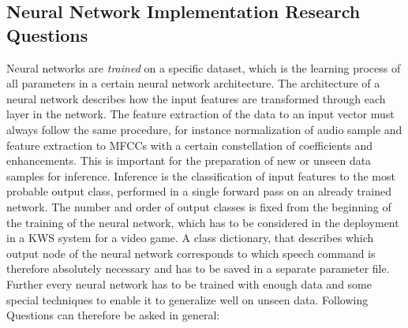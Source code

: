 
\subsection{Neural Network Implementation Research Questions}\label{sec:intro_rq_nn}
Neural networks are \emph{trained} on a specific dataset, which is the learning process of all parameters in a certain neural network architecture. 
The architecture of a neural network describes how the input features are transformed through each layer in the network.
The feature extraction of the data to an input vector must always follow the same procedure, for instance normalization of audio sample and feature extraction to MFCCs with a certain constellation of coefficients and enhancements.
This is important for the preparation of new or unseen data samples for inference.
Inference is the classification of input features to the most probable output class, performed in a single forward pass on an already trained network.
The number and order of output classes is fixed from the beginning of the training of the neural network, which has to be considered in the deployment in a KWS system for a video game.
A class dictionary, that describes which output node of the neural network corresponds to which speech command is therefore absolutely necessary and has to be saved in a separate parameter file.
Further every neural network has to be trained with enough data and some special techniques to enable it to generalize well on unseen data.
Following Questions can therefore be asked in general:

